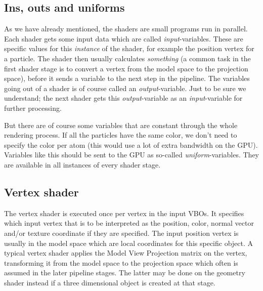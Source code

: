 \subsection{Ins, outs and uniforms}
\label{sec:opengl_uniforms}
As we have already mentioned, the shaders are small programs run in parallel. Each shader gets some input data which are called \textit{input}-variables. These are specific values for this \textit{instance} of the shader, for example the position vertex for a particle. The shader then usually calculates \textit{something} (a common task in the first shader stage is to convert a vertex from the model space to the projection space), before it sends a variable to the next step in the pipeline. The variables going out of a shader is of course called an \textit{output}-variable. Just to be sure we understand; the next shader gets this \textit{output}-variable as an \textit{input}-variable for further processing.

But there are of course some variables that are constant through the whole rendering process. If all the particles have the same color, we don't need to specify the color per atom (this would use a lot of extra bandwidth on the GPU). Variables like this should be sent to the GPU as so-called \textit{uniform}-variables. They are available in all instances of every shader stage.

\subsection{Vertex shader}
The vertex shader is executed once per vertex in the input VBOs. It specifies which input vertex that is to be interpreted as the position, color, normal vector and/or texture coordinate if they are specified. The input position vertex is usually in the model space which are local coordinates for this specific object. A typical vertex shader applies the Model View Projection matrix on the vertex, transforming it from the model space to the projection space which often is assumed in the later pipeline stages. The latter may be done on the geometry shader instead if a three dimensional object is created at that stage.

